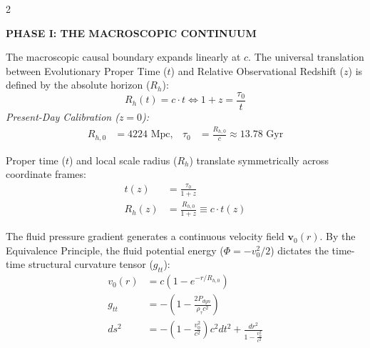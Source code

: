 \documentclass[11pt, a4paper]{article}
\newcounter{cheatnum}
\begin{document}
\begin{multicols}{2}

\vspace{0.2cm}
\noindent\textbf{\large \color{academiabrown} PHASE I: THE MACROSCOPIC CONTINUUM}
\vspace{0.2cm}

\begin{tcolorbox}[cheatbox, title={\refstepcounter{cheatnum}\label{box:axiom}\thecheatnum. Fundamental Axiom \& Translation \scriptsize\hfill\hyperref[sec:deriv_axiom]{[Proof $\downarrow$]}}]
The macroscopic causal boundary expands linearly at $c$. The universal translation between Evolutionary Proper Time ($t$) and Relative Observational Redshift ($z$) is defined by the absolute horizon ($R_h$):
\begin{equation}\label{eq:axiom}
    R_h(t) = c \cdot t \iff 1+z = \frac{\tau_0}{t}
\end{equation}
\textit{Present-Day Calibration ($z=0$):}
\begin{align*}
    R_{h,0} &= 4224 \text{ Mpc}, &\tau_0 &= \frac{R_{h,0}}{c} \approx 13.78 \text{ Gyr}
\end{align*}
\end{tcolorbox}

\begin{tcolorbox}[cheatbox, title={\refstepcounter{cheatnum}\label{box:chronometer}\thecheatnum. The High-Redshift Chronometer \scriptsize\hfill\hyperref[sec:deriv_chronometer]{[Proof $\downarrow$]}}]
Proper time ($t$) and local scale radius ($R_h$) translate symmetrically across coordinate frames:
\begin{align}
    t(z) &= \frac{\tau_0}{1+z} \label{eq:tz} \\
    R_h(z) &= \frac{R_{h,0}}{1+z} \equiv c \cdot t(z) \label{eq:rz}
\end{align}
\end{tcolorbox}

\begin{tcolorbox}[cheatbox, title={\refstepcounter{cheatnum}\label{box:gr_bridge}\thecheatnum. The Geometric Spacetime Bridge \scriptsize\hfill\hyperref[sec:deriv_gr_bridge]{[Proof $\downarrow$]}}]
The fluid pressure gradient generates a continuous velocity field $\mathbf{v}_0(r)$. By the Equivalence Principle, the fluid potential energy ($\Phi = -v_0^2/2$) dictates the time-time structural curvature tensor ($g_{tt}$):
\begin{align}
    v_0(r) &= c\left(1-e^{-r/R_{h,0}}\right) \label{eq:v0} \\
    g_{tt} &= -\left( 1 - \frac{2 P_{dyn}}{\rho_{\tau} c^2} \right) \label{eq:pressure_curvature_identity}\\ 
    ds^2 &= -\left(1 - \frac{v_0^2}{c^2}\right)c^2 dt^2 + \frac{dr^2}{1 - \frac{v_0^2}{c^2}} \label{eq:metric}
\end{align}
\end{tcolorbox}


\end{multicols}
\end{document}
